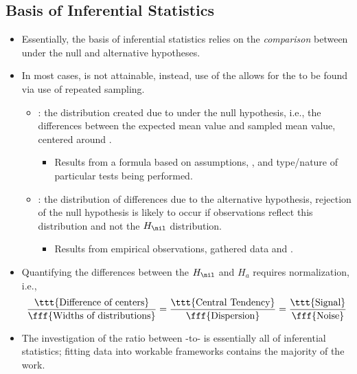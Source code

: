 \begin{itemize}
  \subsection{Basis of Inferential Statistics}
  \begin{itemize}
    \item Essentially, the basis of inferential statistics relies on the \emph{comparison} between \hyperref[Section: Sampling]{} under the null and alternative hypotheses.
    \item In most cases, \hyperref[Subsection: Population vs. Sample Data]{} is not attainable, instead, use of the \hyperref[Subsection: Law of Large Numbers and Central Limit Theorem]{} allows for the \hyperref[Section: Sampling]{} to be found via use of repeated sampling.
      \begin{itemize}
        \item {}: the distribution created due to \hyperref[Section: Sampling]{} under the null hypothesis, i.e., the differences between the expected mean value and sampled mean value, centered around \nil.
          \begin{itemize}
            \item Results from a formula based on assumptions, \hyperref[Subsection: Degrees of Freedom]{}, and type/nature of particular tests being performed.
          \end{itemize}
        \item {}: the distribution of differences due to the alternative hypothesis, rejection of the null hypothesis is likely to occur if observations reflect this distribution and not the \(H_\nil\) distribution.
          \begin{itemize}
            \item Results from empirical observations, gathered data and \hyperref[Subsection: Sampling Methods]{}.
          \end{itemize}
      \end{itemize}
    \item Quantifying the differences between the \(H_\nil\) and \(H_a\) requires normalization, i.e.,
    \[%
    \frac{\text{\ttt{Difference of centers}}}
    {\text{\fff{Widths of distributions}}} = 
    \frac{\text{\ttt{Central Tendency}}}
    {\text{\fff{Dispersion}}} = 
    \frac{\text{\ttt{Signal}}}
    {\text{\fff{Noise}}}
    \]%
    \item The investigation of the ratio between -to- is essentially all of inferential statistics; fitting data into workable frameworks contains the majority of the work.
  \end{itemize}
    

\end{itemize}
